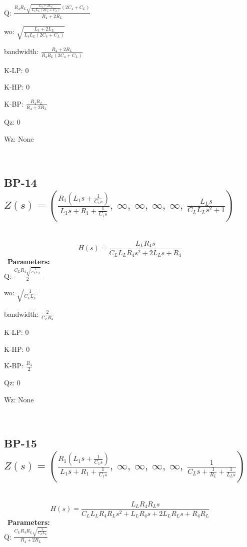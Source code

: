 \documentclass{article}
\begin{document}
Q: $\frac{R_{4} R_{L} \sqrt{\frac{L_{4} + 2 L_{L}}{L_{4} L_{L} \left(2 C_{4} + C_{L}\right)}} \left(2 C_{4} + C_{L}\right)}{R_{4} + 2 R_{L}}$\ 

wo: $\sqrt{\frac{L_{4} + 2 L_{L}}{L_{4} L_{L} \left(2 C_{4} + C_{L}\right)}}$\ 

bandwidth: $\frac{R_{4} + 2 R_{L}}{R_{4} R_{L} \left(2 C_{4} + C_{L}\right)}$\ 

K-LP: $0$\ 

K-HP: $0$\ 

K-BP: $\frac{R_{4} R_{L}}{R_{4} + 2 R_{L}}$\ 

Qz: $0$\ 

Wz: $\text{None}$\ 

\ 

\subsection{BP-14 $Z(s) = \left( \frac{R_{1} \left(L_{1} s + \frac{1}{C_{1} s}\right)}{L_{1} s + R_{1} + \frac{1}{C_{1} s}}, \  \infty, \  \infty, \  \infty, \  \infty, \  \frac{L_{L} s}{C_{L} L_{L} s^{2} + 1}\right)$ } \ 
\textbf{\[H(s) = \frac{L_{L} R_{4} s}{C_{L} L_{L} R_{4} s^{2} + 2 L_{L} s + R_{4}}\] } \ 
\textbf{Parameters:}\\ 

Q: $\frac{C_{L} R_{4} \sqrt{\frac{1}{C_{L} L_{L}}}}{2}$\ 

wo: $\sqrt{\frac{1}{C_{L} L_{L}}}$\ 

bandwidth: $\frac{2}{C_{L} R_{4}}$\ 

K-LP: $0$\ 

K-HP: $0$\ 

K-BP: $\frac{R_{4}}{2}$\ 

Qz: $0$\ 

Wz: $\text{None}$\ 

\ 

\subsection{BP-15 $Z(s) = \left( \frac{R_{1} \left(L_{1} s + \frac{1}{C_{1} s}\right)}{L_{1} s + R_{1} + \frac{1}{C_{1} s}}, \  \infty, \  \infty, \  \infty, \  \infty, \  \frac{1}{C_{L} s + \frac{1}{R_{L}} + \frac{1}{L_{L} s}}\right)$ } \ 
\textbf{\[H(s) = \frac{L_{L} R_{4} R_{L} s}{C_{L} L_{L} R_{4} R_{L} s^{2} + L_{L} R_{4} s + 2 L_{L} R_{L} s + R_{4} R_{L}}\] } \ 
\textbf{Parameters:}\\ 

Q: $\frac{C_{L} R_{4} R_{L} \sqrt{\frac{1}{C_{L} L_{L}}}}{R_{4} + 2 R_{L}}$\ 
\end{document}
